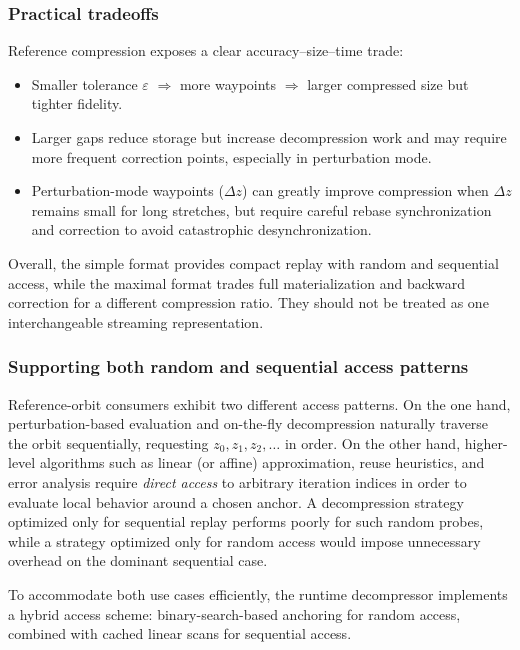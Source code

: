 \subsubsection{Practical tradeoffs}

Reference compression exposes a clear accuracy--size--time trade:
\begin{itemize}
  \item Smaller tolerance \(\varepsilon\) \(\Rightarrow\) more waypoints \(\Rightarrow\) larger compressed size but tighter fidelity.
  \item Larger gaps reduce storage but increase decompression work and may require more frequent correction points,
        especially in perturbation mode.
  \item Perturbation-mode waypoints (\(\Delta z\)) can greatly improve compression when \(\Delta z\) remains small for long
        stretches, but require careful rebase synchronization and correction to avoid catastrophic desynchronization.
\end{itemize}

Overall, the simple format provides compact replay with random and sequential
access, while the maximal format trades full materialization and backward
correction for a different compression ratio.  They should not be treated as
one interchangeable streaming representation.

\subsubsection{Supporting both random and sequential access patterns}
\label{sec:refcomp-runtime-access}

Reference-orbit consumers exhibit two different access patterns.
On the one hand, perturbation-based evaluation and on-the-fly decompression
naturally traverse the orbit sequentially, requesting
\(z_0, z_1, z_2, \dots\) in order.  On the other hand, higher-level algorithms
such as linear (or affine) approximation, reuse heuristics, and error analysis
require \emph{direct access} to arbitrary iteration indices in order to evaluate
local behavior around a chosen anchor.  A decompression strategy optimized only
for sequential replay performs poorly for such random probes, while a strategy
optimized only for random access would impose unnecessary overhead on the
dominant sequential case.

To accommodate both use cases efficiently, the runtime decompressor implements a
hybrid access scheme: binary-search-based anchoring for random access, combined
with cached linear scans for sequential access.

